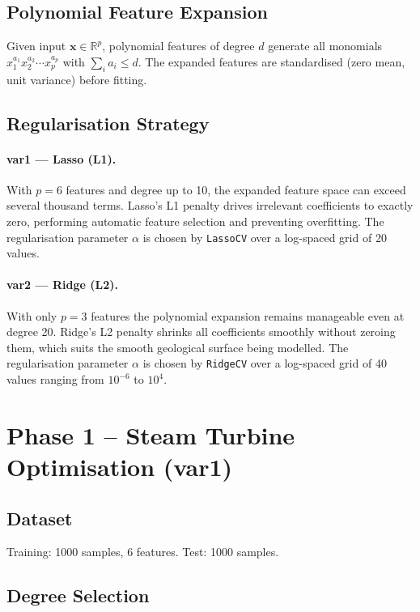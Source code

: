 \documentclass[11pt,a4paper]{article}
\begin{document}
\subsection{Polynomial Feature Expansion}

Given input $\mathbf{x} \in \mathbb{R}^p$, polynomial features of degree $d$ generate all
monomials $x_1^{a_1} x_2^{a_2} \cdots x_p^{a_p}$ with $\sum_i a_i \leq d$.
The expanded features are standardised (zero mean, unit variance) before fitting.

\subsection{Regularisation Strategy}

\paragraph{var1 --- Lasso (L1).}
With $p=6$ features and degree up to 10, the expanded feature space can exceed several
thousand terms.  Lasso's L1 penalty drives irrelevant coefficients to exactly zero,
performing automatic feature selection and preventing overfitting.
The regularisation parameter $\alpha$ is chosen by \texttt{LassoCV} over a log-spaced
grid of 20 values.

\paragraph{var2 --- Ridge (L2).}
With only $p=3$ features the polynomial expansion remains manageable even at degree 20.
Ridge's L2 penalty shrinks all coefficients smoothly without zeroing them, which suits
the smooth geological surface being modelled.
The regularisation parameter $\alpha$ is chosen by \texttt{RidgeCV} over a log-spaced
grid of 40 values ranging from $10^{-6}$ to $10^{4}$.

\section{Phase 1 -- Steam Turbine Optimisation (var1)}

\subsection{Dataset}
Training: 1000 samples, 6 features. Test: 1000 samples.

\subsection{Degree Selection}
\end{document}
